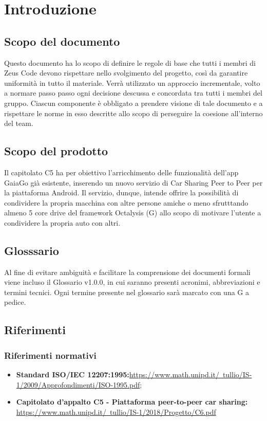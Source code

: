 \section {Introduzione}
\subsection {Scopo del documento}
Questo documento  ha lo scopo di definire le regole di base che tutti i membri di Zeus Code devono rispettare nello svolgimento del progetto, così da garantire uniformità in tutto il materiale. Verrà utilizzato un approccio incrementale, volto a normare passo passo ogni decisione descussa e concordata tra tutti i membri del gruppo. Ciascun componente è obbligato a prendere visione di tale documento e a rispettare le norme in esso descritte allo scopo di perseguire la coesione all'interno del team.
\subsection {Scopo del prodotto}
Il capitolato C5 ha per obiettivo l'arricchimento delle funzionalità dell'app GaiaGo già esistente, inserendo un nuovo servizio di Car Sharing Peer to Peer per la piattaforma Android.
Il servizio, dunque, intende offrire la possibilità di condividere la propria macchina con altre persone amiche o meno sfrutttando almeno 5 core drive del framework Octalysis (G) allo scopo di motivare l'utente a condividere la propria auto con altri.
\subsection {Glosssario}
Al fine di evitare ambiguità e facilitare la comprensione dei documenti formali viene incluso il Glossario v1.0.0, in cui saranno presenti acronimi, abbreviazioni e termini tecnici. Ogni termine presente nel glossario sarà marcato con una G a pedice.
\subsection {Riferimenti}
\subsubsection {Riferimenti normativi}

\begin{itemize}
	\item  \textbf{Standard ISO/IEC 12207:1995:}\href{https://www.math.unipd.it/~tullio/IS-1/2009/Approfondimenti/ISO_12207-1995.pdf}{https://www.math.unipd.it/~tullio/IS-1/2009/Approfondimenti/ISO-1995.pdf};
	\item \textbf{Capitolato d'appalto C5 - Piattaforma peer-to-peer car sharing:} \href{https://www.math.unipd.it/~tullio/IS- 1/2018/Progetto/C6.pdf}{https://www.math.unipd.it/~tullio/IS-1/2018/Progetto/C6.pdf}
\end{itemize}

